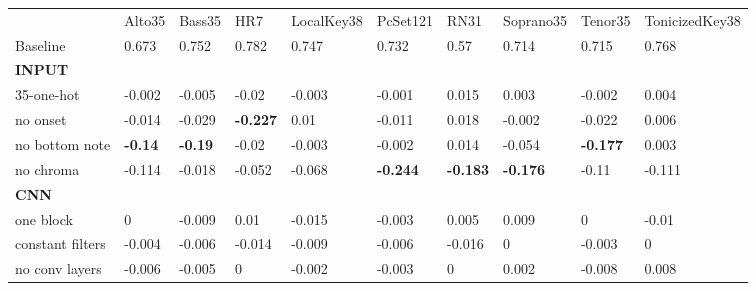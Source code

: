 \begin{tabular}{llllllllll}
                                & Alto35         & Bass35         & HR7             & LocalKey38      & PcSet121        & RN31            & Soprano35       & Tenor35         & TonicizedKey38  \\
Baseline                        & 0.673          & 0.752          & 0.782           & 0.747           & 0.732           & 0.57            & 0.714           & 0.715           & 0.768           \\
\textbf{INPUT}                  &                &                &                 &                 &                 &                 &                 &                 &                 \\
35-one-hot                      & -0.002         & -0.005         & -0.02           & -0.003          & -0.001          & 0.015           & 0.003           & -0.002          & 0.004           \\
no onset                        & -0.014         & -0.029         & \textbf{-0.227} & 0.01            & -0.011          & 0.018           & -0.002          & -0.022          & 0.006           \\
no bottom note                  & \textbf{-0.14} & \textbf{-0.19} & -0.02           & -0.003          & -0.002          & 0.014           & -0.054          & \textbf{-0.177} & 0.003           \\
no chroma                       & -0.114         & -0.018         & -0.052          & -0.068          & \textbf{-0.244} & \textbf{-0.183} & \textbf{-0.176} & -0.11           & -0.111          \\
\textbf{CNN}                    &                &                &                 &                 &                 &                 &                 &                 &                 \\
one block                       & 0              & -0.009         & 0.01            & -0.015          & -0.003          & 0.005           & 0.009           & 0               & -0.01           \\
constant filters                & -0.004         & -0.006         & -0.014          & -0.009          & -0.006          & -0.016          & 0               & -0.003          & 0               \\
no conv layers                  & -0.006         & -0.005         & 0               & -0.002          & -0.003          & 0               & 0.002           & -0.008          & 0.008           \\

\end{tabular}
